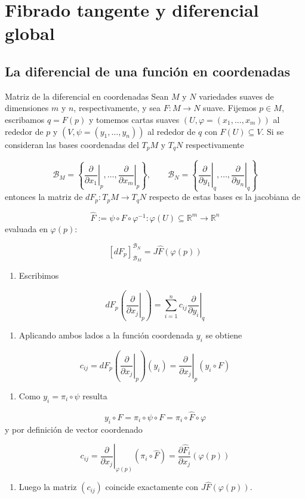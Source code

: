 \chapter{Fibrado tangente y diferencial global}
\label{ch:teo-7}
\section{La diferencial de una función en coordenadas}
\begin{bookproposition}{Matriz de la diferencial en coordenadas}
Sean $M$ y $N$ variedades suaves de dimensiones $m$ y $n$, respectivamente, y sea $F:M\to N$ suave. Fijemos $p\in M$, escribamos $q=F(p)$ y tomemos cartas suaves $(U,\varphi=(x_1,\dots,x_m))$ al rededor de $p$ y $(V,\psi=(y_1,\dots,y_n))$ al rededor de $q$ con $F(U)\subseteq V$. Si se consideran las bases coordenadas del $T_{p}M$ y $T_{q}N$ respectivamente

\[
\mathcal B_M=\left\{\left.\frac{\partial}{\partial x_1}\right|_p,\dots,\left.\frac{\partial}{\partial x_m}\right|_p\right\},\qquad\mathcal B_N=\left\{\left.\frac{\partial}{\partial y_1}\right|_q,\dots,\left.\frac{\partial}{\partial y_n}\right|_q\right\}
\]
entonces la matriz de $dF_p:T_pM\to T_qN$ respecto de estas bases es la jacobiana de

\[
\widehat F:=\psi\circ F\circ\varphi^{-1}:\varphi(U)\subseteq\mathbb R^m\to\mathbb R^n
\]
evaluada en $\varphi(p)$:

\[
[dF_p]_{\mathcal B_M}^{\mathcal B_N}=J\widehat F(\varphi(p))
\]
\end{bookproposition}
\begin{bookproof}{}
\begin{enumerate}
\item Escribimos
\end{enumerate}
\[
dF_p\left(\left.\frac{\partial}{\partial x_j}\right|_p\right)=\sum_{i=1}^n c_{ij}\left.\frac{\partial}{\partial y_i}\right|_q
\]
\begin{enumerate}[start=2]
\item Aplicando ambos lados a la función coordenada $y_i$ se obtiene
\end{enumerate}
\[
c_{ij}=dF_p\left(\left.\frac{\partial}{\partial x_j}\right|_p\right)(y_i) = \left.\frac{\partial}{\partial x_j}\right|_p(y_i\circ F)
\]
\begin{enumerate}[start=3]
\item Como $y_i=\pi_i\circ\psi$ resulta
\end{enumerate}
\[
y_i\circ F=\pi_i\circ\psi\circ F=\pi_i\circ\widehat F\circ\varphi
\]
y por definición de vector coordenado

\[
c_{ij}=\left.\frac{\partial}{\partial x_j}\right|_{\varphi(p)}(\pi_i\circ\widehat F)=\frac{\partial \widehat F_i}{\partial x_j}(\varphi(p))
\]
\begin{enumerate}[start=4]
\item Luego la matriz $(c_{ij})$ coincide exactamente con $J\widehat F(\varphi(p))$.
\end{enumerate}
\bookqed
\end{bookproof}
\label{blk:bb7fdf}
